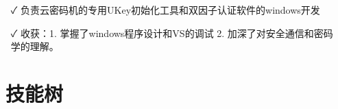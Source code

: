 \documentclass[14pt]{resume}
\begin{document}
\begin{itemize}
  \item[\faCheck] 负责云密码机的专用UKey初始化工具和双因子认证软件的windows开发
  \item[\faCheck] 收获：1. 掌握了windows程序设计和VS的调试 2. 加深了对安全通信和密码学的理解。
\end{itemize}


\section{\faCogs\ 技能树}
\end{document}
